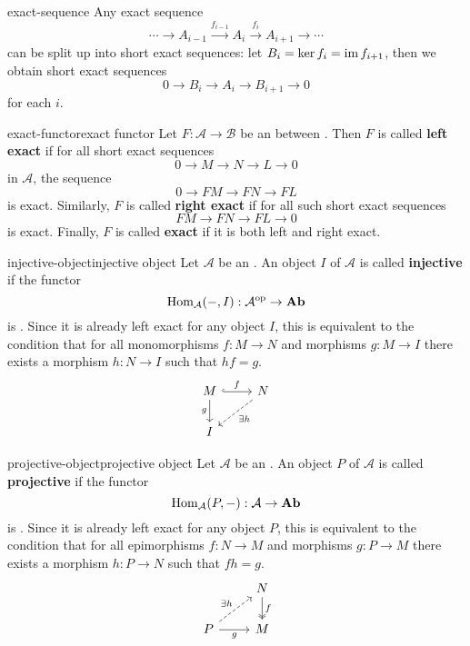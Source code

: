 \begin{example}{exact-sequence}
    Any exact sequence
    \[ \cdots \rightarrow A_{i - 1} \xrightarrow{f_{i - 1}} A_i \xrightarrow{f_i} A_{i + 1} \rightarrow \cdots \]
    can be split up into short exact sequences: let $B_i = \ker f_i = \operatorname{im} f_{i + 1}$, then we obtain short exact sequences
    \[ 0 \to B_i \to A_i \to B_{i + 1} \to 0 \]
    for each $i$.
\end{example}

\begin{topic}{exact-functor}{exact functor}
    Let $F : \mathcal{A} \to \mathcal{B}$ be an  between . Then $F$ is called \textbf{left exact} if for all short exact sequences
    \[ 0 \to M \to N \to L \to 0 \]
     in $\mathcal{A}$, the sequence
    \[ 0 \to FM \to FN \to FL \]
    is exact. Similarly, $F$ is called \textbf{right exact} if for all such short exact sequences
    \[ FM \to FN \to FL \to 0 \]
    is exact. Finally, $F$ is called \textbf{exact} if it is both left and right exact.
\end{topic}

\begin{topic}{injective-object}{injective object}
    Let $\mathcal{A}$ be an . An object $I$ of $\mathcal{A}$ is called \textbf{injective} if the functor
    \[ \text{Hom}_\mathcal{A}(-, I) : \mathcal{A}^\text{op} \to \textbf{Ab} \]
    is . Since it is already left exact for any object $I$, this is equivalent to the condition that for all monomorphisms $f : M \to N$ and morphisms $g : M \to I$ there exists a morphism $h : N \to I$ such that $hf = g$.
    \[ \begin{tikzcd} M \arrow[hookrightarrow]{r}{f} \arrow[swap]{d}{g} & N \arrow[dashed]{ld}{\exists h} \\ I & \end{tikzcd} \]
\end{topic}

\begin{topic}{projective-object}{projective object}
    Let $\mathcal{A}$ be an . An object $P$ of $\mathcal{A}$ is called \textbf{projective} if the functor
    \[ \text{Hom}_\mathcal{A}(P, -) : \mathcal{A} \to \textbf{Ab} \]
    is . Since it is already left exact for any object $P$, this is equivalent to the condition that for all epimorphisms $f : N \to M$ and morphisms $g : P \to M$ there exists a morphism $h : P \to N$ such that $fh = g$.
    \[ \begin{tikzcd} & N \arrow[twoheadrightarrow]{d}{f} \\ P \arrow[swap]{r}{g} \arrow[dashed]{ur}{\exists h} & M \end{tikzcd} \]
\end{topic}


